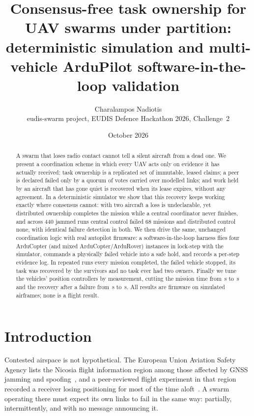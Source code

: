\documentclass[a4paper,11pt]{article}
\title{\sffamily\bfseries Consensus-free task ownership for UAV swarms under partition:\\[2pt]
\large deterministic simulation and multi-vehicle ArduPilot software-in-the-loop validation}
\author{Charalampos Nadiotis\\[2pt]\small eudis-swarm project, EUDIS Defence Hackathon 2026, Challenge~2}
\date{October 2026}
\begin{document}
\maketitle

\begin{abstract}
\noindent
A swarm that loses radio contact cannot tell a silent aircraft from a dead one.
We present a coordination scheme in which every UAV acts only on evidence it has
actually received: task ownership is a replicated set of immutable, leased
claims; a peer is declared failed only by a quorum of votes carried over
modelled links; and work held by an aircraft that has gone quiet is recovered
when its lease expires, without any agreement. In a deterministic simulator we
show that this recovery keeps working exactly where consensus cannot: with two
aircraft a loss is undeclarable, yet distributed ownership completes the
mission while a central coordinator never finishes, and across 440 jammed runs
central control failed 68 missions and distributed control none, with
identical failure detection in both. We then drive the same, unchanged
coordination logic with real autopilot firmware: a software-in-the-loop
harness flies four ArduCopter (and mixed ArduCopter/ArduRover) instances in
lock-step with the simulator, commands a physically failed vehicle into a safe
hold, and records a per-step evidence log. In repeated runs every mission
completed, the failed vehicle stopped, its task was recovered by the survivors
and no task ever had two owners. Finally we tune the vehicles' position
controllers by measurement, cutting the mission time from
\stockMissionMean\,\si{s} to \tunedMissionMean\,\si{s} and the recovery after a
failure from \stockRecoveryMean\,\si{s} to \tunedRecoveryMean\,\si{s}. All
results are firmware on simulated airframes; none is a flight result.
\end{abstract}

\section{Introduction}

Contested airspace is not hypothetical. The European Union Aviation Safety
Agency lists the Nicosia flight information region among those affected by GNSS
jamming and spoofing~\cite{easa2026sib}, and a peer-reviewed flight experiment
in that region recorded a receiver losing positioning for most of the time
aloft~\cite{osechas2022gnss}. A swarm operating there must expect its own
links to fail in the same way: partially, intermittently, and with no message
announcing it.
\end{document}
